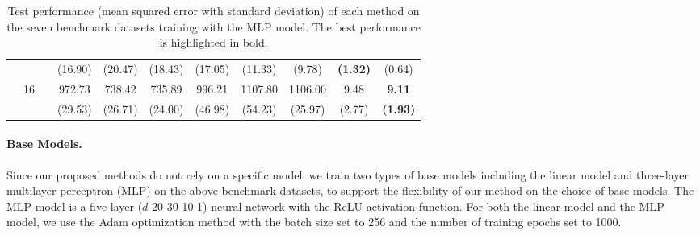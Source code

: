 \documentclass[letterpaper]{article} %
\begin{document}
\begin{table}[!t]
{\begin{tabular}{clcccccccc|cc}
\multicolumn{2}{c}{}                             &                       &                             & (16.90)                   & (20.47)                   & (18.43)                     & (17.05)                   & (11.33)                   & (9.78)                      & \textbf{(1.32)}     & (0.64)                \\
\multicolumn{2}{c}{}                             & \multirow{2}{*}{16}   &                             & 972.73                    & 738.42                    & 735.89                      & 996.21                    & 1107.80                   & 1106.00                     & 9.48                & \textbf{9.11}         \\
\multicolumn{2}{c}{}                             &                       &                             & (29.53)                   & (26.71)                   & (24.00)                     & (46.98)                   & (54.23)                   & (25.97)                     & (2.77)              & \textbf{(1.93)}
\\
\bottomrule
\end{tabular}
}
\caption{Test performance (mean squared error with standard deviation) of each method on the seven benchmark datasets training with the MLP model. The best performance is highlighted in bold.}
\label{tab2}
\end{table}
\paragraph{Base Models.}
Since our proposed methods do not rely on a specific model, we train two types of base models including the linear model and three-layer multilayer perceptron (MLP) on the above benchmark datasets, to support the flexibility of our method on the choice of base models. The MLP model is a five-layer ($d$-20-30-10-1) neural network with the ReLU activation function. For both the linear model and the MLP model, we use the Adam optimization method \cite{kingma2015adam} with the batch size set to 256 and the number of training epochs set to 1000.
\end{document}
